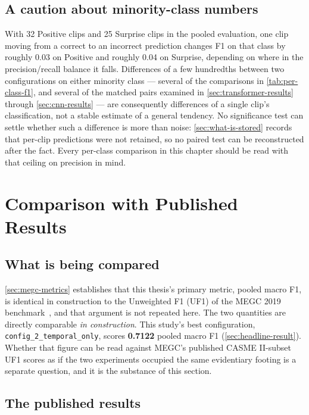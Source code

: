 \subsection{A caution about minority-class numbers}
\label{sec:minority-caution}

With 32 Positive clips and 25 Surprise clips in the pooled evaluation, one clip moving from a correct to an incorrect prediction changes F1 on that class by roughly 0.03 on Positive and roughly 0.04 on Surprise, depending on where in the precision/recall balance it falls. Differences of a few hundredths between two configurations on either minority class --- several of the comparisons in \autoref{tab:per-class-f1}, and several of the matched pairs examined in \autoref{sec:transformer-results} through \autoref{sec:cnn-results} --- are consequently differences of a single clip's classification, not a stable estimate of a general tendency. No significance test can settle whether such a difference is more than noise: \autoref{sec:what-is-stored} records that per-clip predictions were not retained, so no paired test can be reconstructed after the fact. Every per-class comparison in this chapter should be read with that ceiling on precision in mind.


\section{Comparison with Published Results}
\label{sec:literature-comparison}

\subsection{What is being compared}
\label{sec:what-compared}

\autoref{sec:megc-metrics} establishes that this thesis's primary metric, pooled macro F1, is identical in construction to the Unweighted F1 (UF1) of the MEGC 2019 benchmark~\cite{see2019}, and that argument is not repeated here. The two quantities are directly comparable \textit{in construction}. This study's best configuration, \texttt{config\_2\_temporal\_only}, scores \textbf{0.7122} pooled macro F1 (\autoref{sec:headline-result}). Whether that figure can be read against MEGC's published CASME II-subset UF1 scores as if the two experiments occupied the same evidentiary footing is a separate question, and it is the substance of this section.

\subsection{The published results}
\label{sec:published-results}

